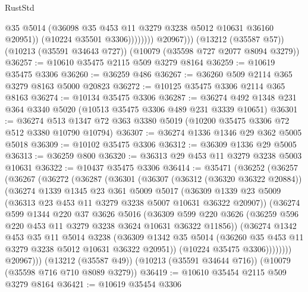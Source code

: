 \begin{lexlean}{RustStd}
\begin{coremodule}
                          @35
                          @5014
                          (@36098 @35 @453 @11 @3279 @3238 @5012 @10631 @36160 @20951))
                        (@10224 @35501 @3306))))))))
          @20967)))
    (@13212 (@35587 @57))
    (@10213 (@35591 @34643 @727))
    (@10079 (@35598 @727 @2077 @8094 @3279))
@36257 := @10610 @35475 @2115 @509 @3279 @8164
@36259 := @10619 @35475 @3306
@36260 := @36259 @486
@36267 := @36260 @509 @2114 @365 @3279 @8163 @5000 @20823
@36272 := @10125 @35475 @3306 @2114 @365 @8163
@36274 := @10134 @35475 @3306
@36287 := @36274 @492 @1348 @231 @364 @3340 @5020 (@10513 @35475 @3306 @489 @231 @3339 @10651)
@36301 := @36274 @513 @1347 @72 @363 @3380 @5019 (@10200 @35475 @3306 @72 @512 @3380 @10790 @10794)
@36307 := @36274 @1336 @1346 @29 @362 @5005 @5018
@36309 := @10102 @35475 @3306
@36312 := @36309 @1336 @29 @5005
@36313 := @36259 @800
@36320 := @36313 @29 @453 @11 @3279 @3238 @5003 @10631
@36322 := @10437 @35475 @3306
@36414 := @35471
    (@36252
      (@36257
        (@36267
          (@36272
            (@36287
              (@36301
                (@36307
                  (@36312 (@36320 @36322 @20884))
                  (@36274
                    @1339
                    @1345
                    @23
                    @361
                    @5009
                    @5017
                    (@36309
                      @1339
                      @23
                      @5009
                      (@36313 @23 @453 @11 @3279 @3238 @5007 @10631 @36322 @20907))
                    (@36274
                      @599
                      @1344
                      @220
                      @37
                      @3626
                      @5016
                      (@36309
                        @599
                        @220
                        @3626
                        (@36259 @596 @220 @453 @11 @3279 @3238 @3624 @10631 @36322 @11856))
                      (@36274
                        @1342
                        @453
                        @35
                        @11
                        @5014
                        @3238
                        (@36309
                          @1342
                          @35
                          @5014
                          (@36260 @35 @453 @11 @3279 @3238 @5012 @10631 @36322 @20951))
                        (@10224 @35475 @3306))))))))
          @20967)))
    (@13212 (@35587 @49))
    (@10213 (@35591 @34644 @716))
    (@10079 (@35598 @716 @710 @8089 @3279))
@36419 := @10610 @35454 @2115 @509 @3279 @8164
@36421 := @10619 @35454 @3306

\end{coremodule}
\end{lexlean}
